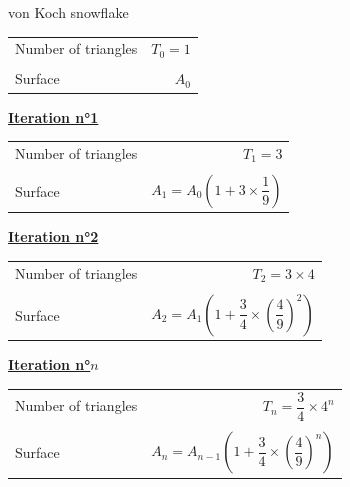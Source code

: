 \documentclass[usenames, dvipsnames, aspectratio=169]{beamer}
\begin{document}
\begin{frame}[t, c]{von Koch snowflake}{}
\begin{minipage}{.68\textwidth}
\begin{overprint}
      \bigskip
      
      \begin{tabular}{lr}
        Number of triangles & $T_0 = 1$ \\
        \\
        Surface & $A_0$
      \end{tabular}

      \begin{center}
        \underline{\textbf{Iteration n°1}}
      \end{center}
      
      \bigskip
      
      \begin{tabular}{lr}
        Number of triangles & $T_1 = 3$ \\
        \\
        Surface & $A_1 = A_0 \left( 1 + 3 \times \dfrac{1}{9} \right)$
      \end{tabular}


      \begin{center}
        \underline{\textbf{Iteration n°2}}
      \end{center}
      
      \bigskip
      
      \begin{tabular}{lr}
        Number of triangles & $T_2 = 3 \times 4$ \\
        \\
        Surface & $A_2 = A_1 \left( 1 + \dfrac{3}{4} \times \left( \dfrac{4}{9} \right)^2 \right)$
      \end{tabular}

      \begin{center}
        \underline{\textbf{Iteration n°$n$}}
      \end{center}
      
      \bigskip
      
      \begin{tabular}{lr}
        Number of triangles & $T_n = \dfrac{3}{4} \times 4^n$ \\
        \\
        Surface & $A_n = A_{n-1} \left( 1 + \dfrac{3}{4} \times \left( \dfrac{4}{9} \right)^n \right)$
      \end{tabular}

    \end{overprint}
  \end{minipage}

  \vfill
\end{frame}
\end{document}
